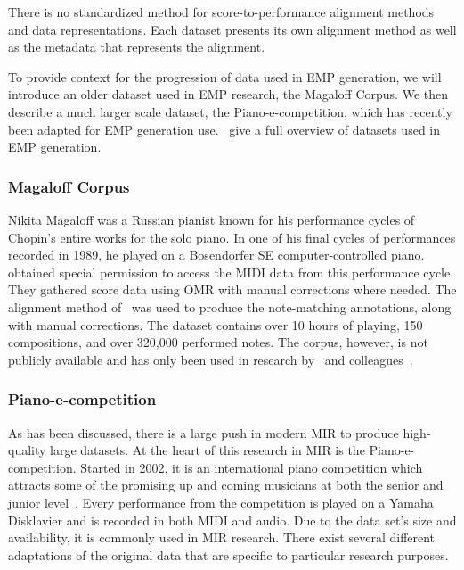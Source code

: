 There is no standardized method for score-to-performance alignment methods and data representations. Each dataset presents its own alignment method as well as the metadata that represents the alignment. 

To provide context for the progression of data used in EMP generation, we will introduce an older dataset used in EMP research, the Magaloff Corpus. We then describe a much larger scale dataset, the Piano-e-competition, which has recently been adapted for EMP generation use.~\citet{cancino2018computational} give a full overview of datasets used in EMP generation. 

\subsubsection{Magaloff Corpus}
Nikita Magaloff was a Russian pianist known for his performance cycles of Chopin's entire works for the solo piano. In one of his final cycles of performances recorded in 1989, he played on a Bosendorfer SE computer-controlled piano.~\citet{flossmann2010magaloff} obtained special permission to access the MIDI data from this performance cycle. They gathered score data using OMR with manual corrections where needed.  The alignment method of~\citet{grachten2006expressivity} was used to produce the note-matching annotations, along with manual corrections. The dataset contains over 10 hours of playing, 150 compositions, and over 320,000 performed notes. The corpus, however, is not publicly available and has only been used in research by~\citet{flossmann2010magaloff} and colleagues~\cite{eduardo2018computational}. 

\subsubsection{Piano-e-competition}
As has been discussed, there is a large push in modern MIR to produce high-quality large datasets. At the heart of this research in MIR is the Piano-e-competition. Started in 2002, it is an international piano competition which attracts some of the promising up and coming musicians at both the senior and junior level~\cite{the-disklavier-education-network}. Every performance from the competition is played on a Yamaha Disklavier and is recorded in both MIDI and audio. Due to the data set's size and availability, it is commonly used in MIR research. There exist several different adaptations of the original data that are specific to particular research purposes. 


